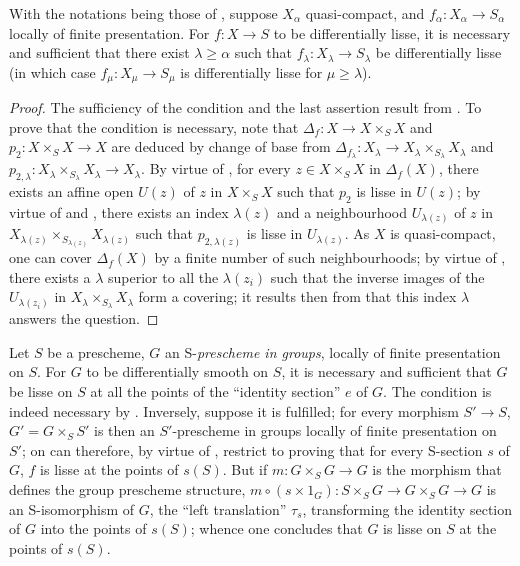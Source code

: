 \begin{corollary}[17.12.6]
\label{IV.17.12.6}
With the notations being those of , suppose $X_\alpha$ quasi-compact, and $f_\alpha:X_\alpha\to S_\alpha$ locally of finite presentation.
For $f:X\to S$ to be differentially lisse, it is necessary and sufficient that there exist $\lambda\geq\alpha$ such that $f_\lambda:X_\lambda\to S_\lambda$ be differentially lisse (in which case $f_\mu:X_\mu\to S_\mu$ is differentially lisse for $\mu\geq\lambda$).
\end{corollary}

\begin{proof}
The sufficiency of the condition and the last assertion result from .
To prove that the condition is necessary, note that $\Delta_f:X\to X\times_S X$ and $p_2:X\times_S X\to X$ are deduced by change of base from $\Delta_{f_\lambda}:X_\lambda\to X_\lambda\times_{S_\lambda} X_\lambda$ and $p_{2,\lambda}:X_\lambda\times_{S_\lambda}X_\lambda\to X_\lambda$.
By virtue of , for every $z\in X\times_S X$ in $\Delta_f(X)$, there exists an affine open $U(z)$ of $z$ in $X\times_S X$ such that $p_2$ is lisse in $U(z)$; by virtue of  and , there exists an index $\lambda(z)$ and a neighbourhood $U_{\lambda(z)}$ of $z$ in $X_{\lambda(z)}\times_{S_{\lambda(z)}} X_{\lambda(z)}$ such that $p_{2,\lambda(z)}$ is lisse in $U_{\lambda(z)}$.
As $X$ is quasi-compact, one can cover $\Delta_f(X)$ by a finite number of such neighbourhoods; by virtue of , there exists a $\lambda$ superior to all the $\lambda(z_i)$ such that the inverse images of the $U_{\lambda(z_i)}$ in $X_\lambda\times_{S_\lambda}X_\lambda$ form a covering; it results then from  that this index $\lambda$ answers the question.
\end{proof}

\begin{example}[17.12.7]
\label{IV.17.12.7}
Let $S$ be a prescheme, $G$ an S-\emph{prescheme in groups}, locally of finite presentation on $S$.
For $G$ to be differentially smooth on $S$, it is necessary and sufficient that $G$ be lisse on $S$ at all the points of the ``identity section'' $e$ of $G$.
The condition is indeed necessary by .
Inversely, suppose it is fulfilled; for every morphism $S'\to S$, $G'=G\times_S S'$ is then an $S'$-prescheme in groups locally of finite presentation on $S'$; on can therefore, by virtue of , restrict to proving that for every S-section $s$ of $G$, $f$ is lisse at the points of $s(S)$.
But if $m:G\times_S G\to G$ is the morphism that defines the group prescheme structure, $m\circ(s\times 1_G):S\times_S G\to G\times_S G\to G$ is an S-isomorphism of $G$, the ``left translation'' $\tau_s$, transforming the identity section of $G$ into the points of $s(S)$; whence one concludes that $G$ is lisse on $S$ at the points of $s(S)$.
\end{example}

